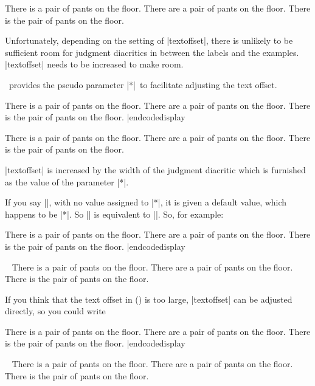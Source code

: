 \framedisplay
\pex
\a There is a pair of pants on the floor.
\a {}There are a pair of pants on the floor.
\a \ljudge*There is the pair of pants on the floor.
\xe
\endframedisplay

\noindent Unfortunately, depending on the setting of
|textoffset|, there is unlikely to be sufficient room for
judgment diacritics in between the labels and the examples.
|textoffset| needs to be increased to make room.

\ExPex\ provides the pseudo parameter |*|\ to
facilitate adjusting the text offset.

\codedisplay
\pex[*=?*]
\a There is a pair of pants on the floor.
\a {}There are a pair of pants on the floor.
\a \ljudge*There is the pair of pants on the floor.
\xe |endcodedisplay

\framedisplay
\pex[*=?*]
\a There is a pair of pants on the floor.
\a {}There are a pair of pants on the floor.
\a \ljudge*There is the pair of pants on the floor.
\xe
\endframedisplay

\noindent |textoffset| is increased by the width of the judgment
diacritic which is furnished as the value of the parameter |*|.

If you say |\lingset{*}|, with no value assigned to |*|, it is
given a default value, which happens to be |*|.  So |\lingset{*}|
is equivalent to |\lingset{*=*}|.  So, for example:

\codedisplay
\pex[*]
\a There is a pair of pants on the floor.
\a \ljudge* There are a pair of pants on the floor.
\a \ljudge* There is the pair of pants on the floor.
\xe |endcodedisplay

\framedisplay~
\pex[*]
\a There is a pair of pants on the floor.
\a \ljudge* There are a pair of pants on the floor.
\a \ljudge* There is the pair of pants on the floor.
\xe
\endframedisplay

If you think that the text offset in (\blastx) is too large,
|textoffset| can be adjusted directly, so you could write

\codedisplay
\pex[textoffset=!.7em]
\a There is a pair of pants on the floor.
\a {} There are a pair of pants on the floor.
\a \ljudge* There is the pair of pants on the floor.
\xe |endcodedisplay

\framedisplay~
\pex[textoffset=!.7em]
\a There is a pair of pants on the floor.
\a {} There are a pair of pants on the floor.
\a \ljudge* There is the pair of pants on the floor.
\xe
\endframedisplay


